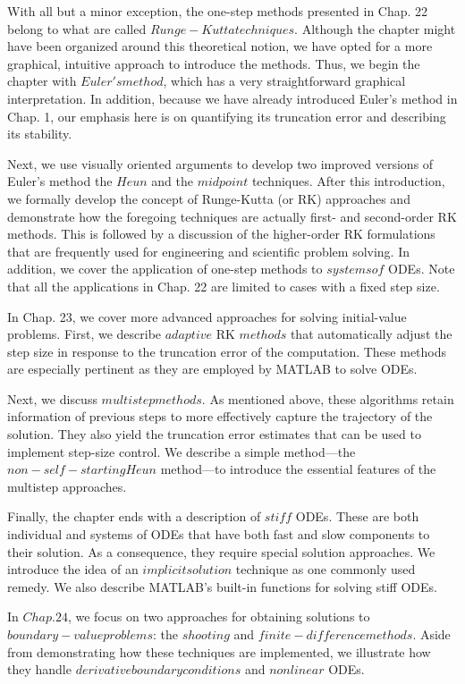 \documentclass[../main.tex]{subfiles}
\begin{document}
With all but a minor exception, the one-step methods presented in Chap. 22 belong to
what are called $Runge-Kutta techniques$. Although the chapter might have been organized
around this theoretical notion, we have opted for a more graphical, intuitive approach to introduce the methods. Thus, we begin the chapter with $Euler's method$, which has a very
straightforward graphical interpretation. In addition, because we have already introduced
Euler's method in Chap. 1, our emphasis here is on quantifying its truncation error and describing its stability. 

Next, we use visually oriented arguments to develop two improved versions of Euler's
method the $Heun$ and the $midpoint$ techniques. After this introduction, we formally develop the concept of Runge-Kutta (or RK) approaches and demonstrate how the foregoing
techniques are actually first- and second-order RK methods. This is followed by a discussion of the higher-order RK formulations that are frequently used for engineering and
scientific problem solving. In addition, we cover the application of one-step methods to
$systems of$ ODEs. Note that all the applications in Chap. 22 are limited to cases with a fixed
step size.

In Chap. 23, we cover more advanced approaches for solving initial-value problems.
First, we describe $adaptive$ RK $methods$ that automatically adjust the step size in response
to the truncation error of the computation. These methods are especially pertinent as they
are employed by MATLAB to solve ODEs.

Next, we discuss $multistep methods$. As mentioned above, these algorithms retain information of previous steps to more effectively capture the trajectory of the solution. They
also yield the truncation error estimates that can be used to implement step-size control. We
describe a simple method—the $non-self-starting Heun$ method—to introduce the essential
features of the multistep approaches.

Finally, the chapter ends with a description of $stiff$ ODEs. These are both individual
and systems of ODEs that have both fast and slow components to their solution. As a consequence, they require special solution approaches. We introduce the idea of an $implicit
solution$ technique as one commonly used remedy. We also describe MATLAB's built-in
functions for solving stiff ODEs.

In $Chap. 24$, we focus on two approaches for obtaining solutions to $boundary-value
problems$: the $shooting$ and $finite-difference methods$. Aside from demonstrating how these
techniques are implemented, we illustrate how they handle $derivative boundary conditions$
and $nonlinear$ ODEs.















	
	
	
	
\end{document}
